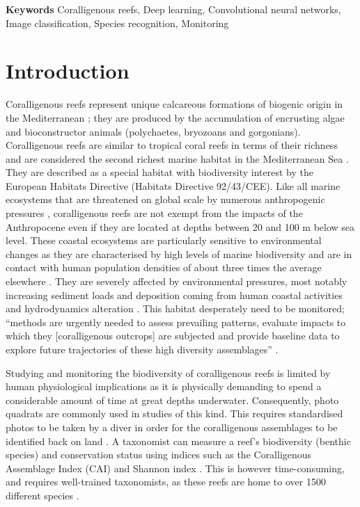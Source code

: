 \medskip

\noindent\textbf{Keywords}
Coralligenous reefs, Deep learning, Convolutional neural networks, Image classification, Species recognition, Monitoring

\section{Introduction}\label{chapitre1_1}
Coralligenous reefs represent unique calcareous formations of biogenic origin in the Mediterranean \citep{ballesteros_mediterranean_2006}; they are produced by the accumulation of encrusting algae and bioconstructor animals (polychaetes, bryozoans and gorgonians). Coralligenous reefs are similar to tropical coral reefs in terms of their richness and are considered the second richest marine habitat in the Mediterranean Sea \citep{boudouresque_marine_2004}. They are described as a special habitat with biodiversity interest by the European Habitats Directive (Habitats Directive 92/43/CEE). Like all marine ecosystems that are threatened on global scale by numerous anthropogenic pressures \citep{halpern_global_2008, hoekstra_confronting_2004}, coralligenous reefs are not exempt from the impacts of the Anthropocene \citep{mcgill_fifteen_2015} even if they are located at depths between 20 and 100 m below sea level. These coastal ecosystems are particularly sensitive to environmental changes as they are characterised by high levels of marine biodiversity \citep{halpern_global_2008} and are in contact with human population densities of about three times the average elsewhere \citep{small_global_2003}. They are severely affected by environmental pressures, most notably increasing sediment loads and deposition coming from human coastal activities and hydrodynamics alteration \citep{airoldi_effects_2003, ballesteros_mediterranean_2006}. This habitat desperately need to be monitored; “methods are urgently needed to assess prevailing patterns, evaluate impacts to which they [coralligenous outcrops] are subjected and provide baseline data to explore future trajectories of these high diversity assemblages” \citep{kipson_rapid_2011}.

Studying and monitoring the biodiversity of coralligenous reefs is limited by human physiological implications as it is physically demanding to spend a considerable amount of time at great depths underwater. Consequently, photo quadrats are commonly used in studies of this kind. This requires standardised photos to be taken by a diver in order for the coralligenous assemblages to be identified back on land \citep{deter_rapid_2012}. A taxonomist can measure a reef’s biodiversity (benthic species) and conservation status using indices such as the Coralligenous Assemblage Index (CAI) \citep{deter_preliminary_2012} and Shannon index \citep{magurran_measuring_2004}. This is however time-consuming, and requires well-trained taxonomists, as these reefs are home to over 1500 different species \citep{ballesteros_mediterranean_2006}. 

